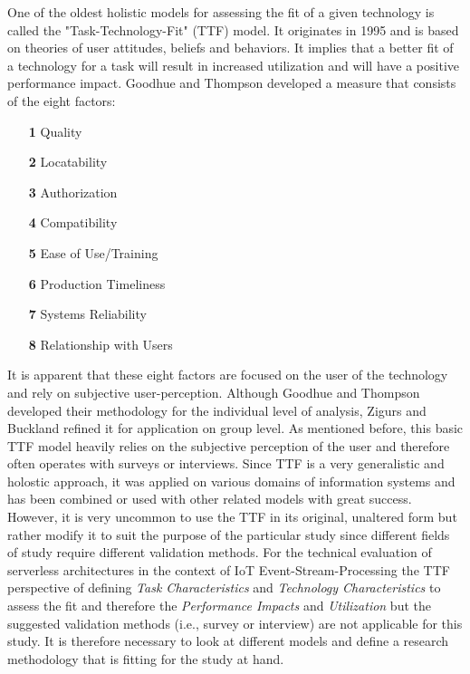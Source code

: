     One of the oldest holistic models for assessing the fit of a given technology is called the "Task-Technology-Fit" (TTF) model. It originates in 1995 and is based on theories of user attitudes, beliefs and behaviors. It implies that a better fit of a technology for a task will result in increased utilization and will have a positive performance impact. Goodhue and Thompson developed a measure that consists of the eight factors:
    \begin{enumerate}
        \item[\textbf{1}] Quality
        \item[\textbf{2}] Locatability
        \item[\textbf{3}] Authorization
        \item[\textbf{4}] Compatibility
        \item[\textbf{5}] Ease of Use/Training
        \item[\textbf{6}] Production Timeliness
        \item[\textbf{7}] Systems Reliability
        \item[\textbf{8}] Relationship with Users
    \end{enumerate}
    It is apparent that these eight factors are focused on the user of the technology and rely on subjective user-perception. Although Goodhue and Thompson developed their methodology for the individual level of analysis, Zigurs and Buckland refined it for application on group level.\autocite{Zigurs1998AEffectiveness} As mentioned before, this basic TTF model heavily relies on the subjective perception of the user and therefore often operates with surveys or interviews. Since TTF is a very generalistic and holostic approach, it was applied on various domains of information systems and has been combined or used with other related models with great success.\\ 
    However, it is very uncommon to use the TTF in its original, unaltered form but rather modify it to suit the purpose of the particular study since different fields of study require different validation methods. For the technical evaluation of serverless architectures in the context of IoT Event-Stream-Processing the TTF perspective of defining \textit{Task Characteristics} and \textit{Technology Characteristics} to assess the fit and therefore the \textit{Performance Impacts} and \textit{Utilization} but the suggested validation methods (i.e., survey or interview) are not applicable for this study. It is therefore necessary to look at different models and define a research methodology that is fitting for the study at hand. 
    
